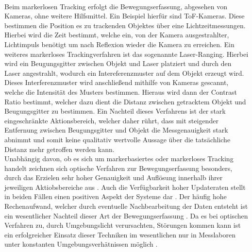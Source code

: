 \\Beim markerlosen Tracking erfolgt die Bewegungserfassung, abgesehen von Kameras, ohne weitere Hilfsmittel. Ein Beispiel hierfür sind ToF-Kameras. Diese bestimmen die Position es zu trackenden Objektes über eine Lichtzeitmessungen. Hierbei wird die Zeit bestimmt, welche ein, von der Kamera ausgestrahlter, Lichtimpuls benötigt um nach Reflexion wieder die Kamera zu erreichen. \cite{basler}
Ein weiteres markerloses Trackingverfahren ist das sogenannte Laser-Ranging. Hierbei wird ein Beugungsgitter zwischen Objekt und Laser platziert und durch den Laser angestrahlt, wodurch ein Intereferenzmuster auf dem Objekt erzeugt wird. Dieses Interferenzmuster wird anschließend mithilfe von Kameras gescannt, welche die Intensität des Musters bestimmen. Hieraus wird dann der Contrast Ratio bestimmt, welcher dazu dient die Distanz zwischen getracktem Objekt und Beugungsgitter zu bestimmen. Ein Nachteil dieses Verfahrens ist der stark eingeschränkte Aktionsbereich, welcher daher rührt, dass mit steigender Entfernung zwischen Beugungsgitter und Objekt die Messgenauigkeit stark abnimmt und somit keine qualitativ wertvolle Aussage über die tatsächliche Distanz mehr getroffen werden kann. \cite{P25}
\\Unabhängig davon, ob es sich um markerbasiertes oder markerloses Tracking handelt zeichnen sich optische Verfahren zur Bewegungserfassung besonders, durch das Erzielen sehr hoher Genauigkeit und Auflösung innerhalb ihrer jeweiligen Aktiobsbereiche aus \cite{P24}. Auch die Verfügbarkeit hoher Updateraten stellt in beiden Fällen einen positiven Aspekt der Systeme dar \cite{P25}.
Der häufig hohe Rechenaufwand, welcher durch eventuelle Nachbearbeitung der Daten entsteht ist ein wesentlicher Nachteil dieser Art der Bewegungserfassung \cite{optsys1}. Da es bei optischen Verfahren zu, durch Umgebungslicht verursachten, Störungen kommen kann ist ein erfolgreicher Einsatz dieser Techniken im wesentlichen nur in Messlaboren unter konstanten Umgebungsverhätnissen möglich \cite{P25}.

